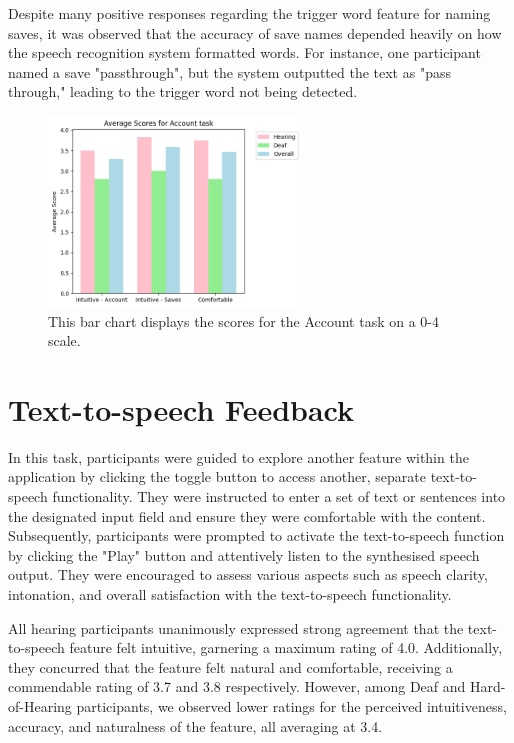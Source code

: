 \documentclass{l4proj}
\begin{document}
Despite many positive responses regarding the trigger word feature for naming saves, it was observed that the accuracy of save names depended heavily on how the speech recognition system formatted words. For instance, one participant named a save "passthrough", but the system outputted the text as "pass through," leading to the trigger word not being detected. 

\begin{figure}
    \centering
    \includegraphics[width=0.6\textwidth]{dissertation/images/ACC.png}
    \caption{This bar chart displays the scores for the Account task on a 0-4 scale.}
    \label{fig:ACC-chart}
\end{figure}

\section{Text-to-speech Feedback}

In this task, participants were guided to explore another feature within the application by clicking the toggle button to access another, separate text-to-speech functionality. They were instructed to enter a set of text or sentences into the designated input field and ensure they were comfortable with the content. Subsequently, participants were prompted to activate the text-to-speech function by clicking the "Play" button and attentively listen to the synthesised speech output. They were encouraged to assess various aspects such as speech clarity, intonation, and overall satisfaction with the text-to-speech functionality.

All hearing participants unanimously expressed strong agreement that the text-to-speech feature felt intuitive, garnering a maximum rating of 4.0. Additionally, they concurred that the feature felt natural and comfortable, receiving a commendable rating of 3.7 and 3.8 respectively. However, among Deaf and Hard-of-Hearing participants, we observed lower ratings for the perceived intuitiveness, accuracy, and naturalness of the feature, all averaging at 3.4.
\end{document}
